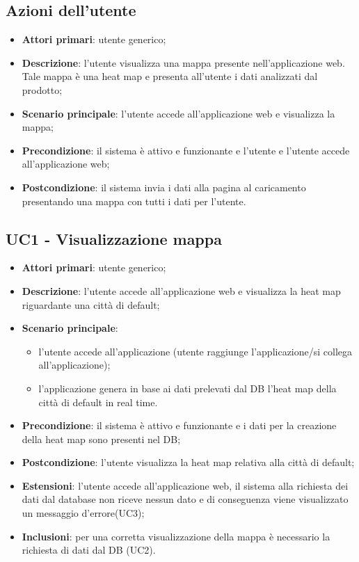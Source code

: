 \subsection{Azioni dell'utente}
\begin{itemize}
	\item \textbf{Attori primari}: utente generico;
	\item \textbf{Descrizione}: l'utente visualizza una mappa presente nell'applicazione web. Tale mappa è una heat map e presenta all'utente i dati analizzati dal prodotto;
	\item \textbf{Scenario principale}: l'utente accede all'applicazione web e visualizza la mappa;
	\item \textbf{Precondizione}: il sistema è attivo e funzionante e l'utente e l'utente accede all'applicazione web;
	\item \textbf{Postcondizione}: il sistema invia i dati alla pagina al caricamento presentando una mappa con tutti i dati per l'utente.
\end{itemize}

\subsection{UC1 - Visualizzazione mappa}
\begin{itemize}
\item \textbf{Attori primari}: utente generico;
\item \textbf{Descrizione}: l’utente accede all’applicazione web e visualizza la heat map riguardante una città di default;
\item \textbf{Scenario principale}: 
	\begin{itemize}
		\item l’utente accede all’applicazione (utente raggiunge l’applicazione/si collega all’applicazione);
		\item l’applicazione genera in base ai dati prelevati dal DB l’heat map della città di default in real time.
	\end{itemize}
\item \textbf{Precondizione}: il sistema è attivo e funzionante e i dati per la creazione della heat map sono presenti nel DB;
\item \textbf{Postcondizione}: l’utente visualizza la heat map relativa alla città di default;
\item \textbf{Estensioni}: l’utente accede all’applicazione web, il sistema alla richiesta dei dati dal database non riceve nessun dato e di conseguenza viene visualizzato un messaggio d’errore(UC3);
\item \textbf{Inclusioni}: per una corretta visualizzazione della mappa è necessario la richiesta di dati dal DB (UC2).
\end{itemize}

